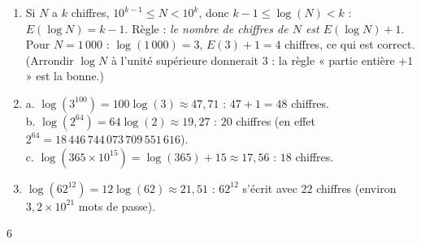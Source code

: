{\begin{enumerate}
\begin{enumerate}[label=\alph*.]
\item $E(\log N)=14$, et $14+1=15$ chiffres.
\end{enumerate}
\item Si $N$ a $k$ chiffres, $10^{k-1}\leqslant N<10^k$, donc $k-1\leqslant\log(N)<k$ : $E(\log N)=k-1$. Règle : \emph{le nombre de chiffres de $N$ est $E(\log N)+1$}. Pour $N=1\,000$ : $\log(1\,000)=3$, $E(3)+1=4$ chiffres, ce qui est correct. (Arrondir $\log N$ à l'unité supérieure donnerait $3$ : la règle « partie entière $+1$ » est la bonne.)
\item a. $\log(3^{100})=100\log(3)\approx47{,}71$ : $47+1=48$ chiffres.\\
b. $\log(2^{64})=64\log(2)\approx19{,}27$ : $20$ chiffres (en effet $2^{64}=18\,446\,744\,073\,709\,551\,616$).\\
c. $\log(365\times10^{15})=\log(365)+15\approx17{,}56$ : $18$ chiffres.
\item $\log(62^{12})=12\log(62)\approx21{,}51$ : $62^{12}$ s'écrit avec $22$ chiffres (environ $3{,}2\times10^{21}$ mots de passe).
\end{enumerate}
}{6}

